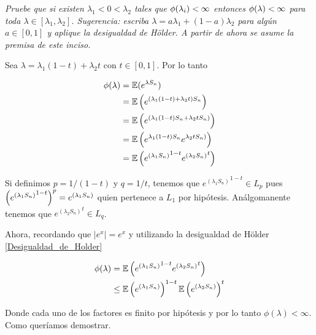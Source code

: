 \emph{
	Pruebe que si existen $\lambda_1<0<\lambda_2$ tales que $\phi\!\left( \lambda_i\right) <\infty$ entonces $\phi\!\left( \lambda\right) <\infty$ 
	para toda $\lambda\in [\lambda_1,\lambda_2]$. Sugerencia: escriba $\lambda=a\lambda_1+(1-a)\lambda_2$ para alg\'un $a\in [0,1]$ 
	y aplique la desigualdad de H\"older. A partir de ahora se asume la premisa de este inciso.
}

\afterstatement\pn

Sea $\lambda = \lambda_1 (1-t) + \lambda_2 t$ con $t \in [0, 1]$. Por lo tanto 

\begin{align}
    \phi(\lambda)   &= \mathbb{E}(e^{\lambda S_n})                                              \\
                    &= \mathbb{E}\left( e^{(\lambda_1 (1-t) + \lambda_2 t) S_n}\right)                 \\
                    &= \mathbb{E}\left( e^{(\lambda_1 (1-t) S_n + \lambda_2 tS_n) }\right)             \\  
                    &= \mathbb{E}\left( e^{\lambda_1 (1-t) S_n} e^{\lambda_2 tS_n) }\right)            \\  
                    &= \mathbb{E}\left( {e^{(\lambda_1 S_n)}}^{1-t} {e^{(\lambda_2 S_n)}}^t\right)       
\end{align}

Si definimos $p = 1/(1-t)$ y $q = 1/t$, tenemos que
${e^{(\lambda_1 S_n)}}^{1-t} \in L_p$ pues $\left( {e^{(\lambda_1 S_n)}}^{1-t}\right) ^p = e^{(\lambda_1 S_n)}$ quien 
pertenece a $L_1$ por hipótesis. Análgomanente tenemos que  ${e^{(\lambda_2 S_n)}}^t \in L_q$.\pn

Ahora, recordando que $|e^x| = e^x$ y utilizando la desigualdad de Hölder \eqref{Desigualdad_de_Holder}

\begin{align}
    \phi(\lambda)   &=      \mathbb{E}\left( {e^{(\lambda_1 S_n)}}^{1-t} {e^{(\lambda_2 S_n)}}^t\right)            \\      
                    &\leq   \mathbb{E}\left( e^{(\lambda_1 S_n)}\right) ^{1-t} \mathbb{E}\left( e^{(\lambda_2 S_n)}\right) ^t     
\end{align}\pn

Donde cada uno de los factores es finito por hipótesis y por lo tanto $\phi(\lambda) < \infty$. Como queríamos demostrar.